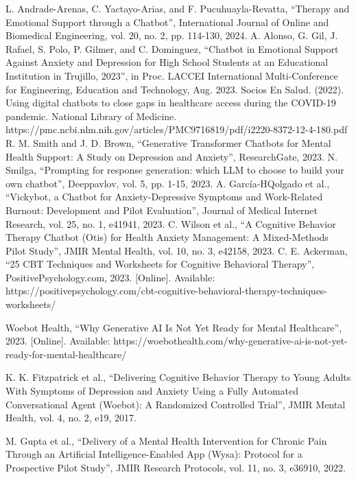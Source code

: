\documentclass[conference]{IEEEtran}
\begin{document}
\begin{thebibliography}{00}
 L. Andrade-Arenas, C. Yactayo-Arias, and F. Pucuhuayla-Revatta, ``Therapy and Emotional Support through a Chatbot'', International Journal of Online and Biomedical Engineering, vol. 20, no. 2, pp. 114-130, 2024.
 A. Alonso, G. Gil, J. Rafael, S. Polo, P. Gilmer, and C. Dominguez, ``Chatbot in Emotional Support Against Anxiety and Depression for High School Students at an Educational Institution in Trujillo, 2023'', in Proc. LACCEI International Multi-Conference for Engineering, Education and Technology, Aug. 2023.
Socios En Salud. (2022). Using digital chatbots to close gaps in healthcare access during the COVID-19 pandemic. National Library of Medicine. https://pmc.ncbi.nlm.nih.gov/articles/PMC9716819/pdf/i2220-8372-12-4-180.pdf
 R. M. Smith and J. D. Brown, ``Generative Transformer Chatbots for Mental Health Support: A Study on Depression and Anxiety'', ResearchGate, 2023.
 N. Smilga, ``Prompting for response generation: which LLM to choose to build your own chatbot'', Deeppavlov, vol. 5, pp. 1-15, 2023.
 A. García-HQolgado et al., ``Vickybot, a Chatbot for Anxiety-Depressive Symptoms and Work-Related Burnout: Development and Pilot Evaluation'', Journal of Medical Internet Research, vol. 25, no. 1, e41941, 2023.
 C. Wilson et al., ``A Cognitive Behavior Therapy Chatbot (Otis) for Health Anxiety Management: A Mixed-Methods Pilot Study'', JMIR Mental Health, vol. 10, no. 3, e42158, 2023.
 C. E. Ackerman, ``25 CBT Techniques and Worksheets for Cognitive Behavioral Therapy'', PositivePsychology.com, 2023. [Online]. Available: https://positivepsychology.com/cbt-cognitive-behavioral-therapy-techniques-worksheets/

 Woebot Health, ``Why Generative AI Is Not Yet Ready for Mental Healthcare'', 2023. [Online]. Available: https://woebothealth.com/why-generative-ai-is-not-yet-ready-for-mental-healthcare/

 K. K. Fitzpatrick et al., ``Delivering Cognitive Behavior Therapy to Young Adults With Symptoms of Depression and Anxiety Using a Fully Automated Conversational Agent (Woebot): A Randomized Controlled Trial'', JMIR Mental Health, vol. 4, no. 2, e19, 2017.

 M. Gupta et al., ``Delivery of a Mental Health Intervention for Chronic Pain Through an Artificial Intelligence-Enabled App (Wysa): Protocol for a Prospective Pilot Study'', JMIR Research Protocols, vol. 11, no. 3, e36910, 2022.


\end{thebibliography}
\end{document}
